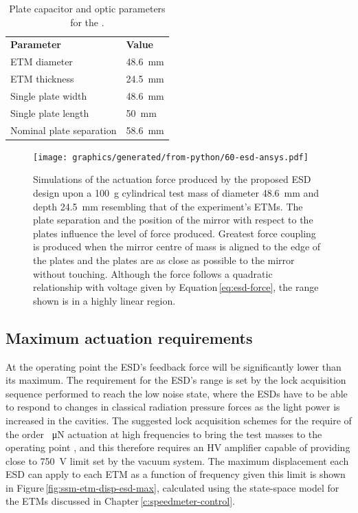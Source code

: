 \begin{table}
  \centering
  \begin{tabular}{ll}
    \textbf{Parameter}   & \textbf{Value} \\
    \gls{ETM} diameter      & \SI{48.6}{\milli\meter} \\
    \gls{ETM} thickness     & \SI{24.5}{\milli\meter} \\
    Single plate width   & \SI{48.6}{\milli\meter} \\
    Single plate length  & \SI{50}{\milli\meter} \\
    Nominal plate separation & \SI{58.6}{\milli\meter} \\
  \end{tabular}
  \caption[Plate capacitor and optic parameters for the \SSMEXPT{}]{\label{tab:ssm-esd-parameters}Plate capacitor and optic parameters for the \SSMEXPT{}.}
\end{table}

\begin{figure}
  \centering
  \texttt{[image: graphics/generated/from-python/60-esd-ansys.pdf]}
  \caption[Simulations of the actuation force produced by the proposed electrostatic drive design]{\label{fig:ssm-esd-ansys}Simulations of the actuation force produced by the proposed \gls{ESD} design upon a \SI{100}{\gram} cylindrical test mass of diameter \SI{48.6}{\milli\meter} and depth \SI{24.5}{\milli\meter} resembling that of the \SSM experiment's ETMs. The plate separation and the position of the mirror with respect to the plates influence the level of force produced. Greatest force coupling is produced when the mirror centre of mass is aligned to the edge of the plates and the plates are as close as possible to the mirror without touching. Although the force follows a quadratic relationship with voltage given by Equation\,\ref{eq:esd-force}, the range shown is in a highly linear region.}
\end{figure}

\subsection{Maximum actuation requirements}
At the operating point the \gls{ESD}'s feedback force will be significantly lower than its maximum. The requirement for the \gls{ESD}'s range is set by the lock acquisition sequence performed to reach the low noise state, where the \glspl{ESD} have to be able to respond to changes in classical radiation pressure forces as the light power is increased in the cavities. The suggested lock acquisition schemes for the \SSMEXPT{} require of the order \SI{}{\micro\newton} actuation at high frequencies to bring the test masses to the operating point \cite{Glaefke2015}, and this therefore requires an \gls{HV} amplifier capable of providing close to \SI{750}{\volt} limit set by the vacuum system. The maximum displacement each \gls{ESD} can apply to each \gls{ETM} as a function of frequency given this limit is shown in Figure\,\ref{fig:ssm-etm-disp-esd-max}, calculated using the state-space model for the \glspl{ETM} discussed in Chapter\,\ref{c:speedmeter-control}.

